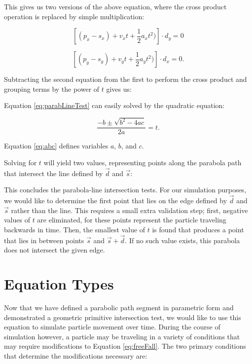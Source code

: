 This gives us two versions of the above equation, where the cross product operation is replaced by simple multiplication:

$$
\left [ (p_x - s_x) + v_x  t + \frac{1}{2} a_x  t^2) \right ] \cdot  d_y = 0
$$

\vspace{0.1in}

$$
\left [ (p_y - s_y) + v_y t + \frac{1}{2} a_y t^2) \right ] \cdot d_x = 0.
$$

Subtracting the second equation from the first to perform the cross product and grouping terms by the power of $t$ gives us:


 {
	\label{eq:parabLineTest}
}

Equation \eqref{eq:parabLineTest} can easily solved by the quadratic equation:

$$
	\frac{-b \pm \sqrt{b^2 - 4ac}}{2a} = t.
$$

Equation \eqref{eq:abc} defines variables $a$, $b$, and $c$.


Solving for $t$ will yield two values, representing points along the parabola path that intersect the line defined by $\vec{d}$ and $\vec{s}$:


This concludes the parabola-line intersection tests. For our simulation purposes, we would like to determine the first point that lies on the edge defined by $\vec{d}$ and $\vec{s}$ rather than the line. This requires a small extra validation step; first, negative values of $t$ are eliminated, for these points represent the particle traveling backwards in time. Then, the smallest value of $t$ is found that produces a point that lies in between points $\vec{s}$ and $\vec{s} + \vec{d}$. If no such value exists, this parabola does not intersect the given edge.

\section{Equation Types}

Now that we have defined a parabolic path segment in parametric form and demonstrated a geometric primitive intersection test, we would like to use this equation to simulate particle movement over time. During the course of simulation however, a particle may be traveling in a variety of conditions that may require modifications to Equation \eqref{eq:freeFall}. The two primary conditions that determine the modifications necessary are:

